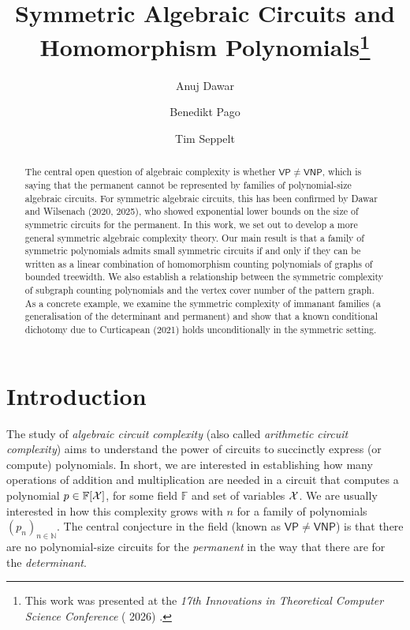 \documentclass[11pt, DIV=15]{scrarticle}
\title{Symmetric Algebraic Circuits and \\ Homomorphism Polynomials\footnote{This work was presented at the \emph{17th Innovations in Theoretical Computer Science Conference} (\textsmaller{ITCS} 2026) \cite{conference_version}.}}
\author{Anuj Dawar \orcidlink{0000-0003-4014-8248} \and Benedikt Pago \orcidlink{0000-0001-6377-1230} \and Tim Seppelt \orcidlink{0000-0002-6447-0568}}
\theoremstyle{definition}
\theoremstyle{plain}
\theoremstyle{remark}
\newcommand{\Xx}{{\cal X}}
\newcommand{\bbN}{\mathbb{N}}
\newcommand{\bbF}{\mathbb{F}}
\newcommand{\VP}{\mathsf{VP}}
\newcommand{\VNP}{\mathsf{VNP}}
\begin{document}
	\maketitle

\begin{abstract}
	The central open question of algebraic complexity is whether $\VP \neq \VNP$, which is saying that the permanent cannot be represented by families of polynomial-size algebraic circuits. 
	For symmetric algebraic circuits, this has been confirmed by Dawar and Wilsenach (2020, 2025), who showed exponential lower bounds on the size of symmetric circuits for the permanent. In this work, we set out to develop a more general symmetric algebraic complexity theory. Our main result is that a family of symmetric polynomials admits small symmetric circuits if and only if they can be written as a linear combination of homomorphism counting polynomials of graphs of bounded treewidth. We also establish a relationship between the symmetric complexity of subgraph counting polynomials and the vertex cover number of the pattern graph. As a concrete example, we examine the symmetric complexity of immanant families (a generalisation of the determinant and permanent) and show that a known conditional dichotomy due to Curticapean (2021) holds unconditionally in the symmetric setting. 
\end{abstract}	


\section{Introduction}	
The study of \emph{algebraic circuit complexity} (also called \emph{arithmetic circuit complexity}) aims to understand the power of circuits to succinctly express (or compute) polynomials.  In short, we are interested in establishing how many operations of addition and multiplication are needed in a circuit that computes a polynomial $p \in \bbF[\Xx]$, for some field $\bbF$ and set of variables $\Xx$.  We are usually interested in how this complexity grows with $n$ for a family of polynomials $(p_n)_{n \in \bbN}$.  The central conjecture in the field (known as $\VP \neq \VNP$) is that there are no polynomial-size circuits for the \emph{permanent} in the way that there are for the \emph{determinant}.
\end{document}
